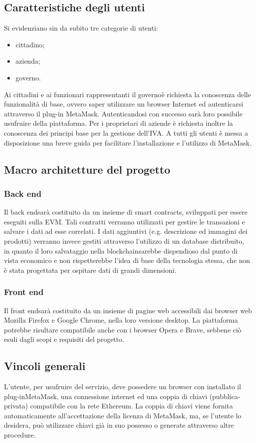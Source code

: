 \subsection{Caratteristiche degli utenti}
Si evidenziano sin da subito tre categorie di utenti:
\begin{itemize}
	\item cittadino;
	\item azienda;
	\item governo\glo.
\end{itemize}
Ai cittadini e ai funzionari rappresentanti il governo\glosp è richiesta la 
conoscenza delle funzionalità di base, ovvero saper utilizzare un browser 
Internet ed autenticarsi attraverso il plug-in MetaMask\glo. Autenticandosi con 
successo sarà loro possibile usufruire della piattaforma. Per i proprietari di 
aziende è richiesta inoltre la conoscenza dei principi base per la gestione 
dell'IVA. A tutti gli utenti è messa a disposizione una breve guida per 
facilitare l'installazione e l'utilizzo di MetaMask\glo. 

\subsection{Macro architetture del progetto}
\subsubsection{Back end}
Il back end\glosp sarà costituito da un insieme di smart contracts\glo, 
sviluppati per essere eseguiti sulla EVM\glo. Tali contratti verranno utilizzati 
per gestire le transazioni e salvare i dati ad esse correlati. I dati aggiuntivi 
(e.g. descrizione ed immagini dei prodotti) verranno invece gestiti attraverso 
l'utilizzo di un database distribuito, in quanto il loro salvataggio nella 
blockchain\glosp sarebbe dispendioso dal punto di vista economico e non 
rispetterebbe l'idea di base della tecnologia stessa, che non è stata progettata 
per ospitare dati di grandi dimensioni.

\subsubsection{Front end}
Il front end\glosp sarà costituito da un insieme di pagine web accessibili dai 
browser web Mozilla Firefox e Google Chrome, nella loro versione desktop. La 
piattaforma potrebbe risultare compatibile anche con i browser Opera e Brave, 
sebbene ciò esuli dagli scopi e requisiti del progetto.

\subsection{Vincoli generali}
L'utente, per usufruire del servizio, deve possedere un browser con installato 
il plug-in\glosp MetaMask\glo, una connessione internet ed una coppia di chiavi 
(pubblica-privata) compatibile con la rete Ethereum\glo. La coppia di chiavi 
viene fornita automaticamente all'accettazione della licenza di MetaMask\glo, 
ma, se l'utente lo desidera, può utilizzare chiavi già in suo possesso o 
generate attraverso altre procedure.


 
